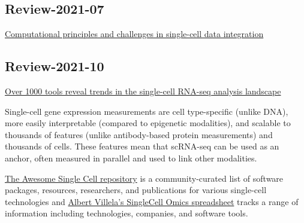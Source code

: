 \documentclass[
]{book}
\begin{document}
\hypertarget{review-2021-07}{%
\subsection{Review-2021-07}\label{review-2021-07}}

\href{https://www.nature.com/articles/s41587-021-00895-7}{Computational principles and challenges in single-cell data integration}\citep{argelaguet2021computational}

\hypertarget{review-2021-10}{%
\subsection{Review-2021-10}\label{review-2021-10}}

\href{https://genomebiology.biomedcentral.com/articles/10.1186/s13059-021-02519-4}{Over 1000 tools reveal trends in the single-cell RNA-seq analysis landscape}\citep{zappia2021over}

Single-cell gene expression measurements are cell type-specific (unlike DNA), more easily interpretable (compared to epigenetic modalities), and scalable to thousands of features (unlike antibody-based protein measurements) and thousands of cells. These features mean that scRNA-seq can be used as an anchor, often measured in parallel and used to link other modalities.

\href{https://github.com/Rongtingting/awesome-single-cell}{The Awesome Single Cell repository} is a community-curated list of software packages, resources, researchers, and publications for various single-cell technologies and \href{https://docs.google.com/spreadsheets/d/1IPe2ozb1Mny8sLvJaSE57RJr3oruiBoSudAVhSH-O8M/edit?pli=1\#gid=237186399}{Albert Villela's SingleCell Omics spreadsheet} tracks a range of information including technologies, companies, and software tools.
\end{document}
